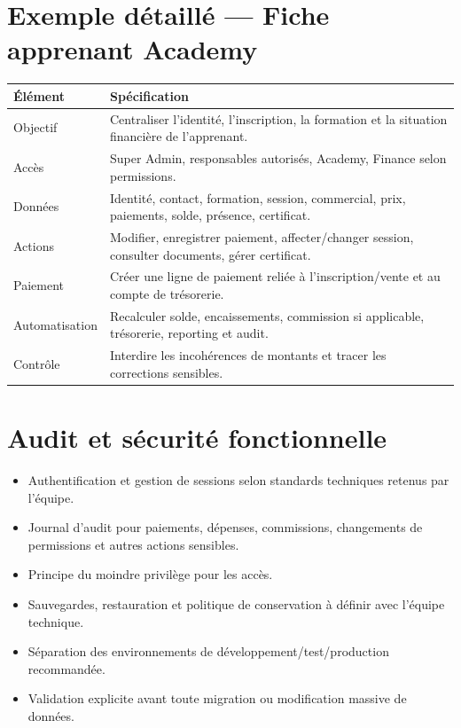 \documentclass[11pt,a4paper]{article}
\newcommand{\tableheader}[2]{\textbf{#1} & \textbf{#2} \\ \hline}
\begin{document}
\section{Exemple détaillé --- Fiche apprenant Academy}

\begin{tabularx}{\textwidth}{|l|X|}
\hline
\tableheader{Élément}{Spécification}
Objectif & Centraliser l'identité, l'inscription, la formation et la situation financière de l'apprenant. \\ \hline
Accès & Super Admin, responsables autorisés, Academy, Finance selon permissions. \\ \hline
Données & Identité, contact, formation, session, commercial, prix, paiements, solde, présence, certificat. \\ \hline
Actions & Modifier, enregistrer paiement, affecter/changer session, consulter documents, gérer certificat. \\ \hline
Paiement & Créer une ligne de paiement reliée à l'inscription/vente et au compte de trésorerie. \\ \hline
Automatisation & Recalculer solde, encaissements, commission si applicable, trésorerie, reporting et audit. \\ \hline
Contrôle & Interdire les incohérences de montants et tracer les corrections sensibles. \\ \hline
\end{tabularx}

\section{Audit et sécurité fonctionnelle}

\begin{itemize}
  \item Authentification et gestion de sessions selon standards techniques retenus par l'équipe.
  \item Journal d'audit pour paiements, dépenses, commissions, changements de permissions et autres actions sensibles.
  \item Principe du moindre privilège pour les accès.
  \item Sauvegardes, restauration et politique de conservation à définir avec l'équipe technique.
  \item Séparation des environnements de développement/test/production recommandée.
  \item Validation explicite avant toute migration ou modification massive de données.
\end{itemize}
\end{document}
